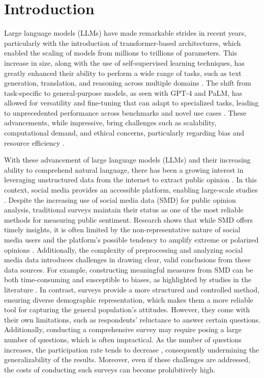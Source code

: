 \section*{Introduction}
Large language models (LLMs) have made remarkable strides in recent years, particularly with the introduction of transformer-based architectures, which enabled the scaling of models from millions to trillions of parameters. This increase in size, along with the use of self-supervised learning techniques, has greatly enhanced their ability to perform a wide range of tasks, such as text generation, translation, and reasoning across multiple domains \cite{patil2024review, naveed2023comprehensive, kumar2024large}. The shift from task-specific to general-purpose models, as seen with GPT-4 and PaLM, has allowed for versatility and fine-tuning that can adapt to specialized tasks, leading to unprecedented performance across benchmarks and novel use cases \cite{hagos2024recent}. These advancements, while impressive, bring challenges such as scalability, computational demand, and ethical concerns, particularly regarding bias and resource efficiency \cite{hagos2024recent}.

With these advancement of large language models (LLMs) and their increasing ability to comprehend natural language, there has been a growing interest in leveraging unstructured data from the internet to extract public opinion \cite{dong2021review,bhatia2024advancing,zhang2024decoding,dui2024social}. In this context, social media provides an accessible platform, enabling large-scale studies \cite{Tumasjan2010PredictingEW,Stieglitz2012SocialMA}. Despite the increasing use of social media data (SMD) for public opinion analysis, traditional surveys maintain their status as one of the most reliable methods for measuring public sentiment. Research shows that while SMD offers timely insights, it is often limited by the non-representative nature of social media users \cite{Ruths2014SocialMedia} and the platform's possible tendency to amplify extreme or polarized opinions \cite{stray2023algorithmic, nordbrandt2023affective}. Additionally, the complexity of preprocessing and analyzing social media data introduces challenges in drawing clear, valid conclusions from these data sources. For example, constructing meaningful measures from SMD can be both time-consuming and susceptible to biases, as highlighted by studies in the literature \cite{reveilhac2022systematic}. In contrast, surveys provide a more structured and controlled method, ensuring diverse demographic representation, which makes them a more reliable tool for capturing the general population's attitudes. However, they come with their own limitations, such as respondents' reluctance to answer certain questions. Additionally, conducting a comprehensive survey may require posing a large number of questions, which is often impractical. As the number of questions increases, the participation rate tends to decrease \cite{galesic2009effects}, consequently undermining the generalizability of the results. Moreover, even if these challenges are addressed, the costs of conducting such surveys can become prohibitively high.

